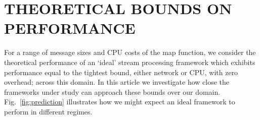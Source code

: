 \documentclass[conference]{IEEEtran}
\begin{document}



\section{THEORETICAL BOUNDS ON PERFORMANCE}\label{theobounds}

For a range of message sizes and CPU costs of the map function,
we consider the theoretical performance of an `ideal' stream processing framework which exhibits performance equal to the tightest bound, either network or CPU, with zero overhead; across this domain. %
In this article we investigate how close the frameworks under study can approach these bounds over our domain.  
Fig.~\ref{fig:prediction} illustrates how we might expect an ideal framework to perform in different regimes.  
\end{document}
